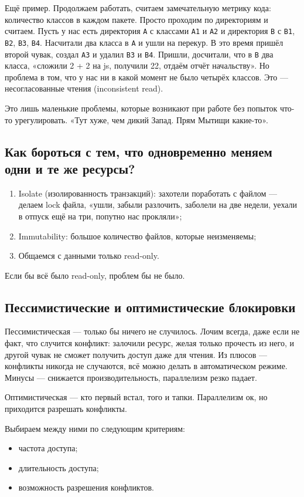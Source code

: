 \documentclass[11pt,a4paper]{article}
\begin{document}
Ещё пример. Продолжаем работать, считаем замечательную метрику кода: количество классов в каждом пакете. Просто проходим по директориям и считаем. Пусть у нас есть директория \texttt{A} с классами \texttt{A1} и \texttt{A2} и директория \texttt{B} с \texttt{B1}, \texttt{B2}, \texttt{B3}, \texttt{B4}. Насчитали два класса в \texttt{A} и ушли на перекур. В это время пришёл второй чувак, создал \texttt{A3} и удалил \texttt{B3} и \texttt{B4}. Пришли, досчитали, что в \texttt{B} два класса, «сложили 2 + 2 на js, получили 22, отдаём отчёт начальству». Но проблема в том, что у нас ни в какой момент не было четырёх классов. Это — несогласованные чтения (inconsistent read).

Это лишь маленькие проблемы, которые возникают при работе без попыток что-то урегулировать. «Тут хуже, чем дикий Запад. Прям Мытищи какие-то».

\subsection{Как бороться с тем, что одновременно меняем одни и те же ресурсы?}
\begin{enumerate}
\item Isolate (изолированность транзакций): захотели поработать с файлом — делаем lock файла, «ушли, забыли разлочить, заболели на две недели, уехали в отпуск ещё на три, попутно нас прокляли»;
\item Immutability: большое количество файлов, которые неизменяемы;
\item Общаемся с данными только read-only.
\end{enumerate}

Если бы всё было read-only, проблем бы не было.

\subsection{Пессимистические и оптимистические блокировки}
Пессимистическая — только бы ничего не случилось. Лочим всегда, даже если не факт, что случится конфликт: залочили ресурс, желая только прочесть из него, и другой чувак не сможет получить доступ даже для чтения. Из плюсов — конфликты никогда не случаются, всё можно делать в автоматическом режиме. Минусы — снижается производительность, параллелизм резко падает.

Оптимистическая — кто первый встал, того и тапки. Параллелизм ок, но приходится разрешать конфликты.

Выбираем между ними по следующим критериям:
\begin{itemize}
\item частота доступа;
\item длительность доступа;
\item возможность разрешения конфликтов.
\end{itemize}
\end{document}
